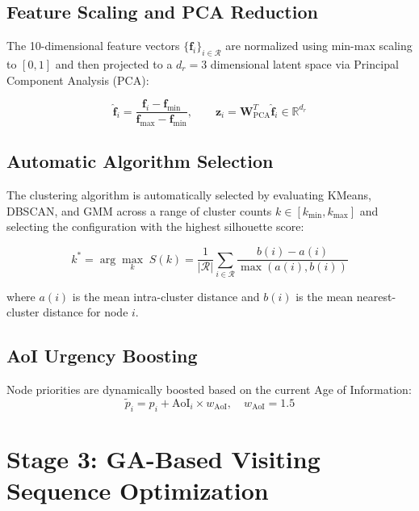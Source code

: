 \documentclass[12pt, a4paper, oneside]{report}
\newcommand{\vect}[1]{\mathbf{#1}}
\begin{document}
\subsection{Feature Scaling and PCA Reduction}

The 10-dimensional feature vectors $\{\vect{f}_i\}_{i \in \mathcal{R}}$ are normalized using min-max scaling to $[0, 1]$ and then projected to a $d_r = 3$ dimensional latent space via Principal Component Analysis (PCA):

\begin{equation}
\hat{\vect{f}}_i = \frac{\vect{f}_i - \vect{f}_{\min}}{\vect{f}_{\max} - \vect{f}_{\min}}, \qquad \vect{z}_i = \vect{W}_{\text{PCA}}^T \hat{\vect{f}}_i \in \mathbb{R}^{d_r}
\label{eq:pca}
\end{equation}

\subsection{Automatic Algorithm Selection}

The clustering algorithm is automatically selected by evaluating KMeans, DBSCAN, and GMM across a range of cluster counts $k \in [k_{\min}, k_{\max}]$ and selecting the configuration with the highest silhouette score:

\begin{equation}
k^* = \arg\max_{k} \; S(k) = \frac{1}{|\mathcal{R}|} \sum_{i \in \mathcal{R}} \frac{b(i) - a(i)}{\max(a(i), b(i))}
\label{eq:silhouette}
\end{equation}

where $a(i)$ is the mean intra-cluster distance and $b(i)$ is the mean nearest-cluster distance for node $i$.

\subsection{AoI Urgency Boosting}

Node priorities are dynamically boosted based on the current Age of Information:
\begin{equation}
\tilde{p}_i = p_i + \text{AoI}_i \times w_{\text{AoI}}, \quad w_{\text{AoI}} = 1.5
\label{eq:aoi_boost}
\end{equation}

\section{Stage 3: GA-Based Visiting Sequence Optimization}
\label{sec:ga_optimizer}
\label{sec:ga}
\end{document}
